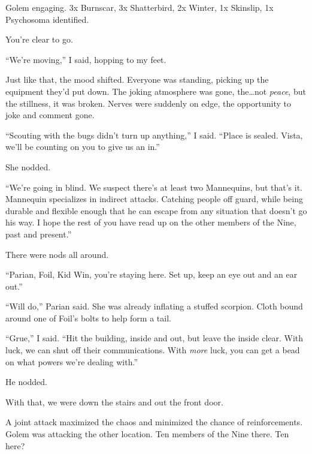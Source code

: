 Golem engaging. 3x Burnscar, 3x Shatterbird, 2x Winter, 1x Skinslip, 1x Psychosoma identified.



You're clear to go.



``We're moving,'' I said, hopping to my feet.



Just like that, the mood shifted.  Everyone was standing, picking up the equipment they'd put down.  The joking atmosphere was gone, the\ldots not \emph{peace}, but the stillness, it was broken.  Nerves were suddenly on edge, the opportunity to joke and comment gone.



``Scouting with the bugs didn't turn up anything,'' I said.  ``Place is sealed.  Vista, we'll be counting on you to give us an in.''



She nodded.



``We're going in blind.  We suspect there's at least two Mannequins, but that's it.  Mannequin specializes in indirect attacks.  Catching people off guard, while being durable and flexible enough that he can escape from any situation that doesn't go his way.  I hope the rest of you have read up on the other members of the Nine, past and present.''



There were nods all around.



``Parian, Foil, Kid Win, you're staying here.  Set up, keep an eye out and an ear out.''



``Will do,'' Parian said.  She was already inflating a stuffed scorpion.  Cloth bound around one of Foil's bolts to help form a tail.



``Grue,'' I said.  ``Hit the building, inside and out, but leave the inside clear.  With luck, we can shut off their communications.  With \emph{more} luck, you can get a bead on what powers we're dealing with.''



He nodded.



With that, we were down the stairs and out the front door.



A joint attack maximized the chaos and minimized the chance of reinforcements.  Golem was attacking the other location.  Ten members of the Nine there.  Ten here?



